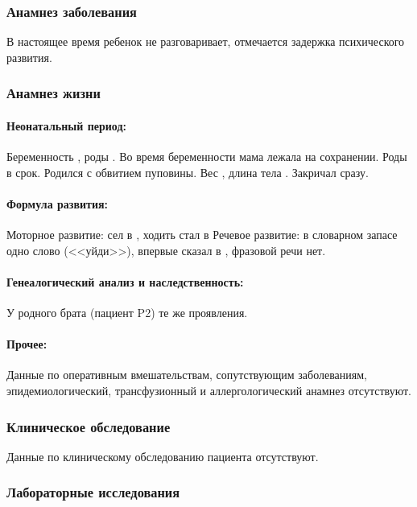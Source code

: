 \documentclass[a4paper,14pt]{extarticle}
\newcommand{\gramm}{г}
\newcommand{\cm}{см}
\newcommand{\months}{мес.}
\begin{document}
\subsubsection*{Анамнез заболевания}

В настоящее время ребенок не разговаривает, отмечается задержка психического развития.

\subsubsection*{Анамнез жизни}

\paragraph{Неонатальный период:} Беременность , роды . Во время беременности мама лежала на сохранении. Роды в срок. Родился с обвитием пуповины.
Вес \numprint[\gramm]{4470}, длина тела \numprint[\cm]{57}.
Закричал сразу. 

\paragraph{Формула развития:} Моторное развитие: сел в \numprint[\months]{7}, ходить стал в \numprint[\months]{10} 
Речевое развитие: в словарном запасе одно слово (<<уйди>>), впервые сказал в , фразовой речи нет.

\paragraph{Генеалогический анализ и наследственность:} У родного брата (пациент P2) те же проявления.

\paragraph{Прочее:} Данные по оперативным вмешательствам, сопутствующим заболеваниям, эпидемиологический, трансфузионный и аллергологический анамнез отсутствуют.

\subsubsection*{Клиническое обследование}

Данные по клиническому обследованию пациента отсутствуют.

\subsubsection*{Лабораторные исследования}
\end{document}
